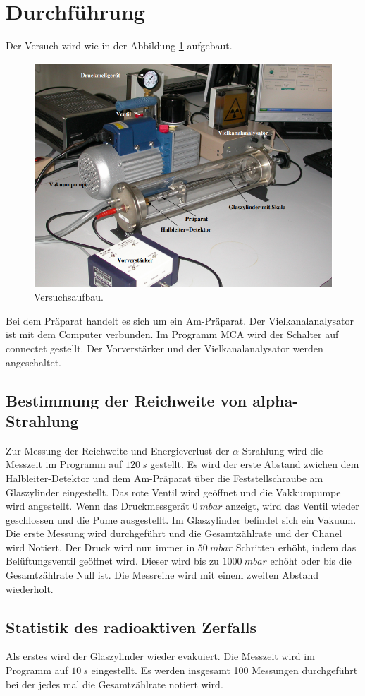 \section{Durchführung}
\label{sec:Durchführung}
Der Versuch wird wie in der Abbildung \ref{fig:Aufbau} aufgebaut.
\begin{figure}
    \centering
    \includegraphics[scale=0.5]{content/Aufbau 701.png}
    \caption{Versuchsaufbau.}
    \label{fig:Aufbau}
\end{figure}
Bei dem Präparat handelt es sich um ein Am-Präparat. Der Vielkanalanalysator ist mit dem Computer verbunden.
Im Programm MCA wird der Schalter auf connectet gestellt. Der Vorverstärker und der Vielkanalanalysator werden angeschaltet.\\


\subsection{Bestimmung der Reichweite von alpha-Strahlung}

\noindent Zur Messung der Reichweite und Energieverlust der $\alpha$-Strahlung wird die Messzeit im Programm auf $\qty{120}{s}$ gestellt.
Es wird der erste Abstand zwichen dem Halbleiter-Detektor und dem Am-Präparat über die Feststellschraube am Glaszylinder eingestellt.
Das rote Ventil wird geöffnet und die Vakkumpumpe wird angestellt. 
Wenn das Druckmessgerät $\qty{0}{mbar}$ anzeigt, wird das Ventil wieder geschlossen und die Pume ausgestellt.
Im Glaszylinder befindet sich ein Vakuum.
Die erste Messung wird durchgeführt und die Gesamtzählrate und der Chanel wird Notiert.
Der Druck wird nun immer in $\qty{50}{mbar}$ Schritten erhöht, indem das Belüftungsventil geöffnet wird.
Dieser wird bis zu $\qty{1000}{mbar}$ erhöht oder bis die Gesamtzählrate Null ist.
Die Messreihe wird mit einem zweiten Abstand wiederholt.

\subsection{Statistik des radioaktiven Zerfalls}
Als erstes wird der Glaszylinder wieder evakuiert.
Die Messzeit wird im Programm auf $\qty{10}{s}$ eingestellt.
Es werden insgesamt 100 Messungen durchgeführt bei der jedes mal die Gesamtzählrate notiert wird.

